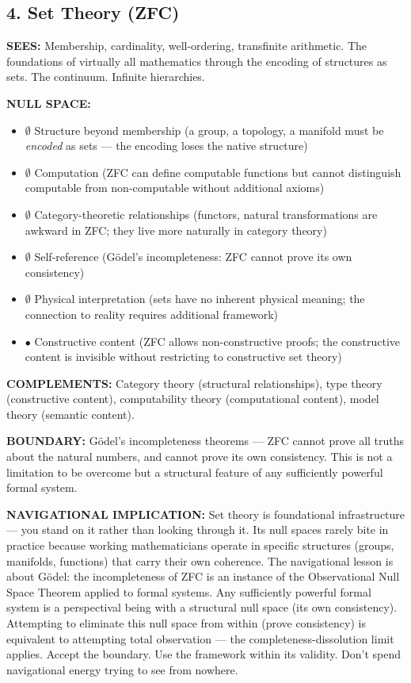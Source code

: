 \bigskip\noindent\makebox[\textwidth]{\color{rulegray}\rule{5cm}{0.3pt}}\bigskip


\subsection*{4. Set Theory (ZFC)}


\textbf{SEES:} Membership, cardinality, well-ordering, transfinite arithmetic. The foundations of virtually all mathematics through the encoding of structures as sets. The continuum. Infinite hierarchies.


\textbf{NULL SPACE:}

\begin{itemize}[nosep,leftmargin=*]
  \item $\emptyset$ Structure beyond membership (a group, a topology, a manifold must be \textit{encoded} as sets — the encoding loses the native structure)
  \item $\emptyset$ Computation (ZFC can define computable functions but cannot distinguish computable from non-computable without additional axioms)
  \item $\emptyset$ Category-theoretic relationships (functors, natural transformations are awkward in ZFC; they live more naturally in category theory)
  \item $\emptyset$ Self-reference (Gödel's incompleteness: ZFC cannot prove its own consistency)
  \item $\emptyset$ Physical interpretation (sets have no inherent physical meaning; the connection to reality requires additional framework)
  \item $\bullet$ Constructive content (ZFC allows non-constructive proofs; the constructive content is invisible without restricting to constructive set theory)
\end{itemize}


\textbf{COMPLEMENTS:} Category theory (structural relationships), type theory (constructive content), computability theory (computational content), model theory (semantic content).


\textbf{BOUNDARY:} Gödel's incompleteness theorems — ZFC cannot prove all truths about the natural numbers, and cannot prove its own consistency. This is not a limitation to be overcome but a structural feature of any sufficiently powerful formal system.


\textbf{NAVIGATIONAL IMPLICATION:} Set theory is foundational infrastructure — you stand on it rather than looking through it. Its null spaces rarely bite in practice because working mathematicians operate in specific structures (groups, manifolds, functions) that carry their own coherence. The navigational lesson is about Gödel: the incompleteness of ZFC is an instance of the Observational Null Space Theorem applied to formal systems. Any sufficiently powerful formal system is a perspectival being with a structural null space (its own consistency). Attempting to eliminate this null space from within (prove consistency) is equivalent to attempting total observation — the completeness-dissolution limit applies. Accept the boundary. Use the framework within its validity. Don't spend navigational energy trying to see from nowhere.


